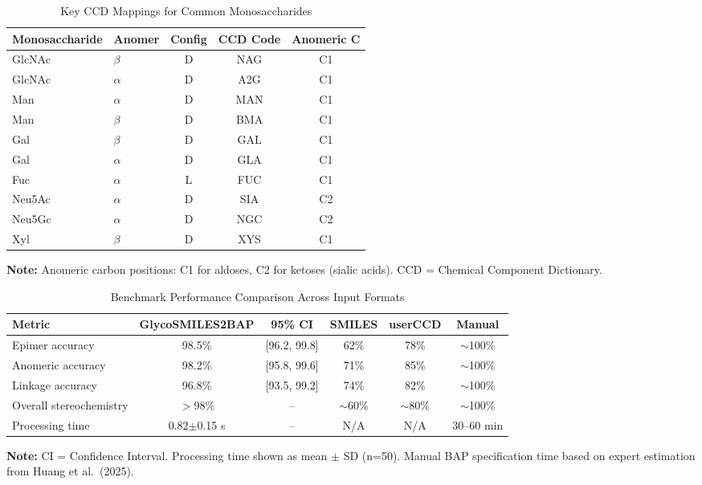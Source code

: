 
\begin{table}[htbp]
\centering
\caption{Key CCD Mappings for Common Monosaccharides}
\label{tab:ccd_mapping}
\begin{tabular}{llccc}
\toprule
Monosaccharide & Anomer & Config & CCD Code & Anomeric C \\
\midrule
GlcNAc & $\beta$ & D & NAG & C1 \\
GlcNAc & $\alpha$ & D & A2G & C1 \\
Man & $\alpha$ & D & MAN & C1 \\
Man & $\beta$ & D & BMA & C1 \\
Gal & $\beta$ & D & GAL & C1 \\
Gal & $\alpha$ & D & GLA & C1 \\
Fuc & $\alpha$ & L & FUC & C1 \\
Neu5Ac & $\alpha$ & D & SIA & C2 \\
Neu5Gc & $\alpha$ & D & NGC & C2 \\
Xyl & $\beta$ & D & XYS & C1 \\
\bottomrule
\end{tabular}
\begin{flushleft}
\small
\textbf{Note:} Anomeric carbon positions: C1 for aldoses, C2 for ketoses (sialic acids).
CCD = Chemical Component Dictionary.
\end{flushleft}
\end{table}

\begin{table}[htbp]
\centering
\caption{Benchmark Performance Comparison Across Input Formats}
\label{tab:performance}
\begin{tabular}{lccccc}
\toprule
Metric & GlycoSMILES2BAP & 95\% CI & SMILES & userCCD & Manual \\
\midrule
Epimer accuracy & 98.5\% & [96.2, 99.8] & 62\% & 78\% & $\sim$100\% \\
Anomeric accuracy & 98.2\% & [95.8, 99.6] & 71\% & 85\% & $\sim$100\% \\
Linkage accuracy & 96.8\% & [93.5, 99.2] & 74\% & 82\% & $\sim$100\% \\
Overall stereochemistry & $>$98\% & -- & $\sim$60\% & $\sim$80\% & $\sim$100\% \\
Processing time & 0.82$\pm$0.15 s & -- & N/A & N/A & 30--60 min \\
\bottomrule
\end{tabular}
\begin{flushleft}
\small
\textbf{Note:} CI = Confidence Interval. Processing time shown as mean $\pm$ SD (n=50).
Manual BAP specification time based on expert estimation from Huang et al.\ (2025).
\end{flushleft}
\end{table}

